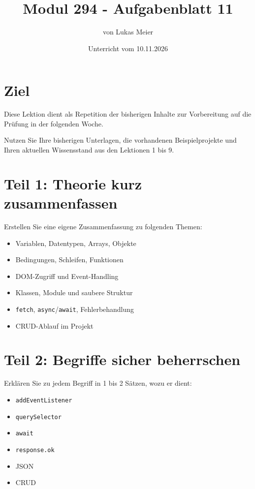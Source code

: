 \documentclass[a4paper,12pt]{article}
\title{Modul 294 - Aufgabenblatt 11}
\author{von Lukas Meier}
\date{Unterricht vom 10.11.2026}
\begin{document}
\maketitle

\section{Ziel}

Diese Lektion dient als Repetition der bisherigen Inhalte zur Vorbereitung auf die Prüfung in der folgenden Woche.

Nutzen Sie Ihre bisherigen Unterlagen, die vorhandenen Beispielprojekte und Ihren aktuellen Wissensstand aus den Lektionen 1 bis 9.

\section{Teil 1: Theorie kurz zusammenfassen}

Erstellen Sie eine eigene Zusammenfassung zu folgenden Themen:
\begin{itemize}
    \item Variablen, Datentypen, Arrays, Objekte
    \item Bedingungen, Schleifen, Funktionen
    \item DOM-Zugriff und Event-Handling
    \item Klassen, Module und saubere Struktur
    \item \texttt{fetch}, \texttt{async}/\texttt{await}, Fehlerbehandlung
    \item CRUD-Ablauf im Projekt
\end{itemize}

\section{Teil 2: Begriffe sicher beherrschen}

Erklären Sie zu jedem Begriff in 1 bis 2 Sätzen, wozu er dient:
\begin{itemize}
    \item \texttt{addEventListener}
    \item \texttt{querySelector}
    \item \texttt{await}
    \item \texttt{response.ok}
    \item JSON
    \item CRUD
\end{itemize}
\end{document}
